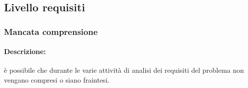 \documentclass[../PianoProgetto.tex]{subfiles}
\begin{document}
\newpage
\subsection{Livello requisiti}

\subsubsection{Mancata comprensione}
\label{sec:Mancata comprensione}

	\paragraph*{Descrizione:} è possibile che durante le varie attività di analisi dei requisiti del problema non vengano compresi o siano fraintesi.
	
	\hspace{0pt}
\end{document}
